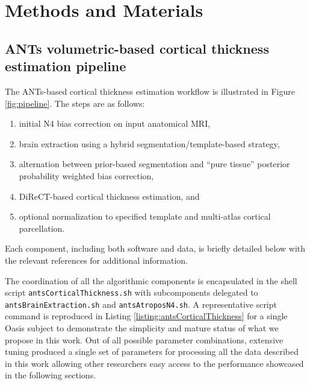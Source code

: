 \section{Methods and Materials}

\subsection{ANTs volumetric-based cortical thickness estimation pipeline}

The ANTs-based cortical thickness estimation workflow is illustrated 
in Figure \ref{fig:pipeline}.  The steps are as follows:
\begin{enumerate}
  \item initial N4 bias correction on input anatomical MRI,
  \item brain extraction using a hybrid segmentation/template-based strategy,
  \item alternation between prior-based segmentation and ``pure tissue'' 
        posterior probability weighted bias correction,
  \item DiReCT-based cortical thickness estimation, and
  \item optional normalization to specified template and multi-atlas
    cortical parcellation. 
\end{enumerate}
Each component, including both software and data, is briefly detailed 
below with the relevant references for additional information. 

The coordination of all the algorithmic components is
encapsulated in the shell script \verb#antsCorticalThickness.sh# with
subcomponents delegated to \verb#antsBrainExtraction.sh# 
and \verb#antsAtroposN4.sh#.  A representative script command 
is reproduced in Listing \ref{listing:antsCorticalThickness} for
a single Oasis subject to demonstrate the simplicity and
mature status of what we propose in this work.  Out of all 
possible parameter combinations, extensive tuning produced
a single set of parameters for processing all the data
described in this work allowing other researchers easy access
to the performance showcased in the following sections.

